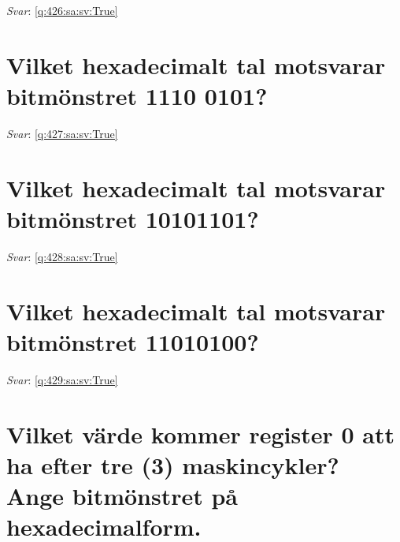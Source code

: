 \documentclass[a4paper,11pt,oneside]{book}
\begin{document}
\begin{sloppypar}
\noindent\makebox[\textwidth]{\hrulefill}

\vspace{1cm}

\textit{Svar}: \autoref{q:426:sa:sv:True}



\section{Vilket hexadecimalt tal motsvarar bitm\"onstret 1110 0101?}

\label{q:427:sa:sv:False}

\vspace{2cm}

\noindent\makebox[\textwidth]{\hrulefill}

\vspace{1cm}

\textit{Svar}: \autoref{q:427:sa:sv:True}



\section{Vilket hexadecimalt tal motsvarar bitm\"onstret 10101101?}

\label{q:428:sa:sv:False}

\vspace{2cm}

\noindent\makebox[\textwidth]{\hrulefill}

\vspace{1cm}

\textit{Svar}: \autoref{q:428:sa:sv:True}



\section{Vilket hexadecimalt tal motsvarar bitm\"onstret 11010100?}

\label{q:429:sa:sv:False}

\vspace{2cm}

\noindent\makebox[\textwidth]{\hrulefill}

\vspace{1cm}

\textit{Svar}: \autoref{q:429:sa:sv:True}



\section{Vilket v\"arde kommer register 0 att ha efter tre (3) maskincykler? Ange bitm\"onstret p\r{a} hexadecimalform.}


\end{sloppypar}
\end{document}
